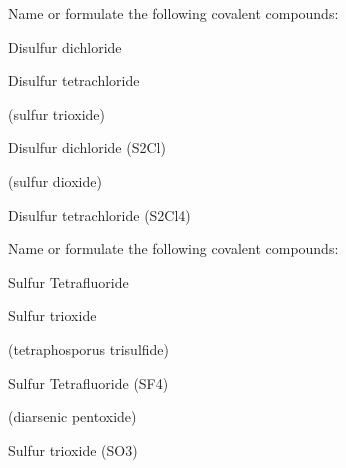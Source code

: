 \documentclass[main.tex]{subfiles}
\begin{document}
\begin{multicols*}{2}
\begin{question}[ID=\the\value{numA}]
Name or formulate the following covalent compounds:
\begin{inparaenum}[(a)]
\item {}				%
\item Disulfur dichloride		%
\item {}				%
\item Disulfur tetrachloride		%
\end{inparaenum}
\end{question}
\begin{solution}
\begin{inparaenum}[(a)]
\item {}		(sulfur trioxide)
\item Disulfur dichloride (S2Cl)	
\item {}		(sulfur dioxide)
\item Disulfur tetrachloride (S2Cl4)	
\end{inparaenum}\hspace{0.1cm}\end{solution}
\begin{question}[ID=\the\value{numA}]
Name or formulate the following covalent compounds:
\begin{inparaenum}[(a)]
\item {}				%
\item Sulfur Tetrafluoride		%
\item {}			%
\item Sulfur trioxide			%
\end{inparaenum}
\end{question}
\begin{solution}
\begin{inparaenum}[(a)]
\item {}		(tetraphosporus trisulfide)
\item Sulfur Tetrafluoride (SF4)	
\item {}	 (diarsenic pentoxide)	
\item Sulfur trioxide	(SO3)
\end{inparaenum}\hspace{0.1cm}\end{solution}







\end{multicols*}
\end{document}

